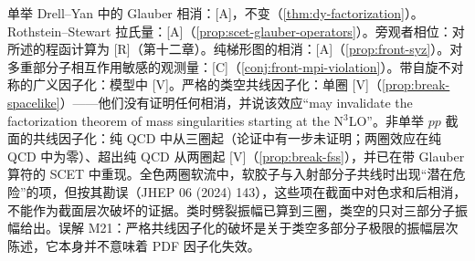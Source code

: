 \begin{remark}\label{rem:front-glauber-status}
单举 Drell--Yan 中的 Glauber 相消：[A]，不变（\cref{thm:dy-factorization}）。Rothstein--Stewart 拉氏量：[A]（\cref{prop:scet-glauber-operators}）。旁观者相位：对所述的程函计算为 [R]（第十二章）。纯梯形图的相消：[A]（\cref{prop:front-syz}）。对多重部分子相互作用敏感的观测量：[C]（\cref{conj:front-mpi-violation}）。带自旋不对称的广义因子化：模型中 [V]。严格的类空共线因子化：单圈 [V]\cite{CataniDeFlorianRodrigo2012}（\cref{prop:break-spacelike}）——他们没有证明任何相消，并说该效应“may invalidate the factorization theorem of mass singularities starting at the N$^3$LO”。非单举 $pp$ 截面的共线因子化：纯 QCD 中从三圈起（论证中有一步未证明；两圈效应在纯 QCD 中为零）、超出纯 QCD 从两圈起 [V]\cite{ForshawSeymourSiodmok2012}（\cref{prop:break-fss}），并已在带 Glauber 算符的 SCET 中重现\cite{Schwartz:2017nmr}。全色两圈软流中，软胶子与入射部分子共线时出现“潜在危险”的项\cite{Dixon:2019lnw}，但按其勘误（JHEP 06 (2024) 143），这些项在截面中对色求和后相消，不能作为截面层次破坏的证据。类时劈裂振幅已算到三圈，类空的只对三部分子振幅给出\cite{Guan:2024hlf}。误解 M21：严格共线因子化的破坏是关于类空多部分子极限的振幅层次陈述，它本身并不意味着 PDF 因子化失效。
\end{remark}
